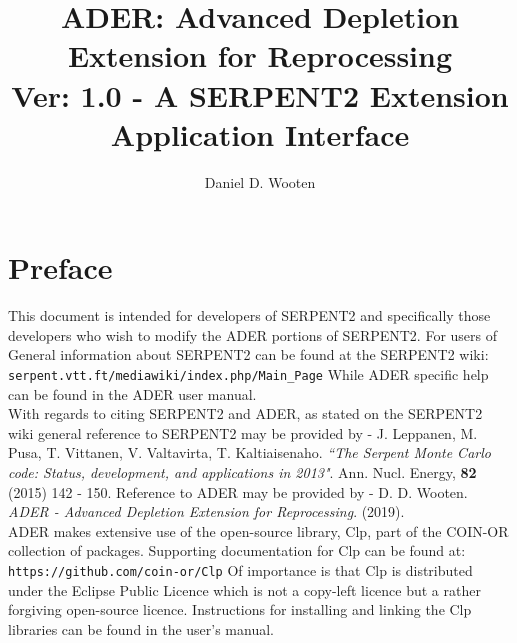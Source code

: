\documentclass{article}
\begin{document}
\title{ADER: Advanced Depletion Extension for Reprocessing\\
\vspace{10pt}\large{Ver: 1.0 - A SERPENT2 Extension}\\
\vspace{10pt}\large{Application Interface}}

\author{
    Daniel D. Wooten
}

\clearpage
\maketitle
\pagebreak

\tableofcontents
\pagebreak

\section{Preface}\label{sec:pref}
This document is intended for developers of SERPENT2 and specifically those
developers who wish to modify the ADER portions of SERPENT2. For users of
General information about SERPENT2 can be found at the SERPENT2
wiki: \verb|serpent.vtt.ft/mediawiki/index.php/Main_Page|
While ADER specific help can be found in the ADER user manual.
\\
With regards to citing SERPENT2 and ADER, as stated on the SERPENT2 wiki general
reference to SERPENT2 may be provided by - J. Leppanen, M. Pusa, T. Vittanen,
V. Valtavirta, T. Kaltiaisenaho. \textit{``The Serpent Monte Carlo code: Status,
development, and applications in 2013"}. Ann. Nucl. Energy, \textbf{82} (2015)
142 - 150. Reference to ADER may be provided by - D. D. Wooten. \textit{ADER -
Advanced Depletion Extension for Reprocessing}. (2019).
\\
ADER makes extensive use of the open-source library, Clp, part of the COIN-OR
collection of packages. Supporting documentation for Clp can be found at: 
\verb|https://github.com/coin-or/Clp|
Of importance is that Clp is distributed under
the Eclipse Public Licence which is not a copy-left licence but a rather
forgiving open-source licence. Instructions for installing and linking the
Clp libraries can be found in the user's manual.
\end{document}
